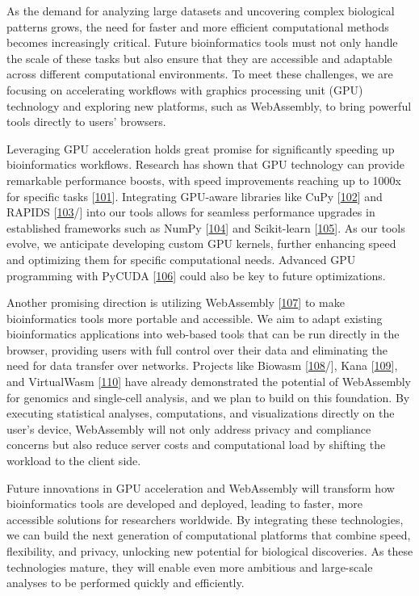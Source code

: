 As the demand for analyzing large datasets and uncovering complex biological patterns grows, the need for faster and more efficient computational methods becomes increasingly critical.
Future bioinformatics tools must not only handle the scale of these tasks but also ensure that they are accessible and adaptable across different computational environments.
To meet these challenges, we are focusing on accelerating workflows with graphics processing unit (GPU) technology and exploring new platforms, such as WebAssembly, to bring powerful tools directly to users' browsers.

Leveraging GPU acceleration holds great promise for significantly speeding up bioinformatics workflows.
Research has shown that GPU technology can provide remarkable performance boosts, with speed improvements reaching up to 1000x for specific tasks {[}\protect\hyperlink{ref-1EIbaYHGq}{101}{]}.
Integrating GPU-aware libraries like CuPy {[}\protect\hyperlink{ref-4iZVPVHz}{102}{]} and RAPIDS {[}\protect\hyperlink{ref-wPsNXL1Q}{103}/{]} into our tools allows for seamless performance upgrades in established frameworks such as NumPy {[}\protect\hyperlink{ref-1LexfAxj}{104}{]} and Scikit-learn {[}\protect\hyperlink{ref-AujvwLp6}{105}{]}.
As our tools evolve, we anticipate developing custom GPU kernels, further enhancing speed and optimizing them for specific computational needs.
Advanced GPU programming with PyCUDA {[}\protect\hyperlink{ref-b5xmRoLZ}{106}{]} could also be key to future optimizations.

Another promising direction is utilizing WebAssembly {[}\protect\hyperlink{ref-ITQaZvrQ}{107}{]} to make bioinformatics tools more portable and accessible.
We aim to adapt existing bioinformatics applications into web-based tools that can be run directly in the browser, providing users with full control over their data and eliminating the need for data transfer over networks.
Projects like Biowasm {[}\protect\hyperlink{ref-Z0f406Zs}{108}/{]}, Kana {[}\protect\hyperlink{ref-1DswCJYT0}{109}{]}, and VirtualWasm {[}\protect\hyperlink{ref-WhJVE7a4}{110}{]} have already demonstrated the potential of WebAssembly for genomics and single-cell analysis, and we plan to build on this foundation.
By executing statistical analyses, computations, and visualizations directly on the user's device, WebAssembly will not only address privacy and compliance concerns but also reduce server costs and computational load by shifting the workload to the client side.

Future innovations in GPU acceleration and WebAssembly will transform how bioinformatics tools are developed and deployed, leading to faster, more accessible solutions for researchers worldwide.
By integrating these technologies, we can build the next generation of computational platforms that combine speed, flexibility, and privacy, unlocking new potential for biological discoveries.
As these technologies mature, they will enable even more ambitious and large-scale analyses to be performed quickly and efficiently.

